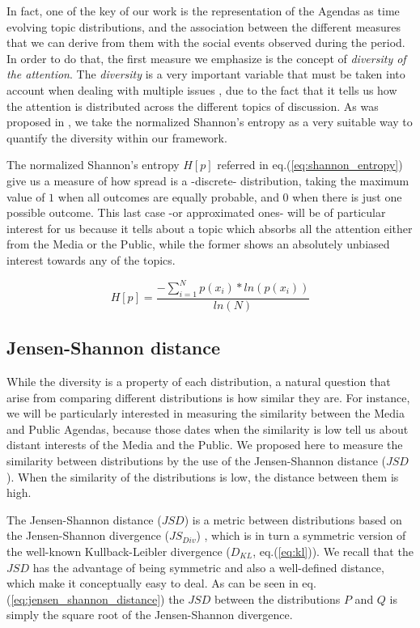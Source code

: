 \documentclass{bmcart}
\begin{document}
\par In fact, one of the key of our work is the representation of the Agendas as time evolving topic distributions, and the association between the different measures that we can derive from them with the social events observed during the period.
In order to do that, the first measure we emphasize is the concept of \emph{diversity of the attention}.
The \emph{diversity} is a very important variable that must be taken into account when dealing with multiple issues \cite{boydstun2014importance}, due to the fact that it tells us how the attention is distributed across the different topics of discussion. 
As was proposed in \cite{boydstun2014importance}, we take the normalized Shannon's entropy as a very suitable way to quantify the diversity within our framework.
\par The normalized Shannon's entropy $H[p]$ referred in eq.(\ref{eq:shannon_entropy}) give us a measure of how spread is a -discrete- distribution, taking the maximum value of $1$ when all outcomes are equally probable, and $0$ when there is just one possible outcome. 
This last case -or approximated ones- will be of particular interest for us because it tells about a topic which absorbs all the attention either from the Media or the Public, while the former shows an absolutely unbiased interest towards any of the topics.

\begin{equation}
H[p] = \frac{- \sum_{i = 1}^{N} p(x_i) * ln(p(x_i))}{ln(N)}
\label{eq:shannon_entropy}
\end{equation}

\subsection*{Jensen-Shannon distance}

\par While the diversity is a property of each distribution, a natural question that arise from comparing different distributions is how similar they are. For instance, we will be particularly interested in measuring the similarity between the Media and Public Agendas, because those dates when the similarity is low tell us about distant interests of the Media and the Public.
We proposed here to measure the similarity between distributions by the use of the Jensen-Shannon distance ($JSD$). 
When the similarity of the distributions is low, the distance between them is high.
\par The Jensen-Shannon distance ($JSD$) is a metric between distributions based on the Jensen-Shannon divergence ($JS_{Div}$) \cite{fuglede2004jensen}, which is in turn a symmetric version of the well-known Kullback-Leibler divergence ($D_{KL}$, eq.(\ref{eq:kl})). 
We recall that the $JSD$ has the advantage of being symmetric and also a well-defined distance, which make it conceptually easy to deal.
As can be seen in eq.(\ref{eq:jensen_shannon_distance}) the $JSD$ between the distributions $P$ and $Q$ is simply the square root of the Jensen-Shannon divergence.
\end{document}
